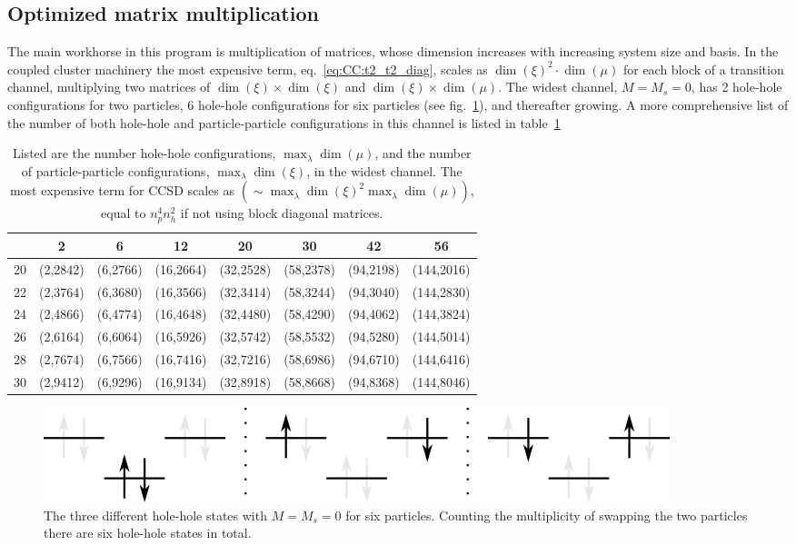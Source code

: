 \subsection{Optimized matrix multiplication}
The main workhorse in this program is multiplication of matrices, whose dimension increases with increasing system size and basis.
In the coupled cluster machinery the most expensive term, eq.~\eqref{eq:CC:t2_t2_diag}, scales as $\dim(\xi)^2 \cdot \dim(\mu)$ for each block of a transition channel, multiplying two matrices of $\dim(\xi)\times\dim(\xi)$ and $\dim(\xi) \times \dim(\mu)$.
The widest channel, $M=M_s = 0$, has 2 hole-hole configurations for two particles, 6 hole-hole configurations for six particles (see fig.~\ref{fig:results:hhStatesF2}), and thereafter growing.
A more comprehensive list of the number of both hole-hole and particle-particle configurations in this channel is listed in table~\ref{tab:results:dimConfig0}
\begin{table}
\begin{center}
\caption{Listed are the number hole-hole configurations, $\max_{\lambda}\dim(\mu)$, and the number of particle-particle configurations, $\max_{\lambda}\dim(\xi)$, in the widest channel. The most expensive term for CCSD scales as $\left(\sim \max_{\lambda}\dim(\xi)^2 \max_{\lambda}\dim(\mu)\right)$, equal to $n_p^4 n_h^2$ if not using block diagonal matrices.}
\label{tab:results:dimConfig0}
\begin{tabular}{c|ccccccc}
 & 2 & 6 & 12 & 20 & 30 & 42 & 56 \\
\hline
20 & (2,2842) & (6,2766) & (16,2664) & (32,2528) & (58,2378) & (94,2198) & (144,2016)  \\
22 & (2,3764) & (6,3680) & (16,3566) & (32,3414) & (58,3244) & (94,3040) & (144,2830)  \\
24 & (2,4866) & (6,4774) & (16,4648) & (32,4480) & (58,4290) & (94,4062) & (144,3824)  \\
26 & (2,6164) & (6,6064) & (16,5926) & (32,5742) & (58,5532) & (94,5280) & (144,5014)  \\
28 & (2,7674) & (6,7566) & (16,7416) & (32,7216) & (58,6986) & (94,6710) & (144,6416)  \\
30 & (2,9412) & (6,9296) & (16,9134) & (32,8918) & (58,8668) & (94,8368) & (144,8046)  \\
\end{tabular}
\end{center}
\end{table}
\begin{figure}
\begin{center}
\includegraphics[scale=1.5]{../10-results/figs/hhStatesF2.png}
\caption{The three different hole-hole states with $M = M_s = 0$ for six particles. Counting the multiplicity of swapping the two particles there are six hole-hole states in total.}
\label{fig:results:hhStatesF2}
\end{center}
\end{figure}

